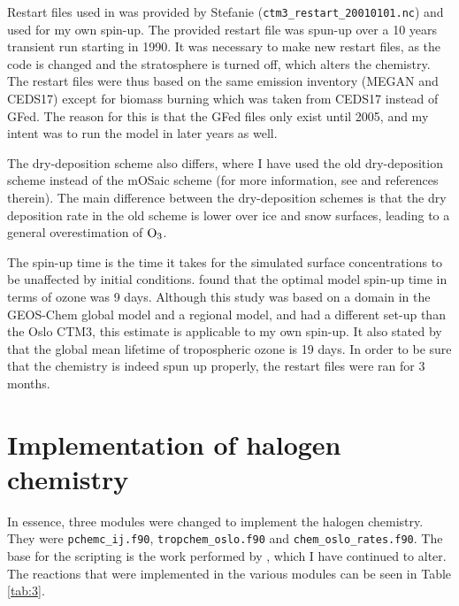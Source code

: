 \medskip

Restart files used in \cite{Falk_2019} was provided by Stefanie (\texttt{ctm3\_restart\_20010101.nc}) and used for my own spin-up. The provided restart file was spun-up over a 10 years transient run starting in 1990. It was necessary to make new restart files, as the code is changed and the stratosphere is turned off, which alters the chemistry. The restart files were thus based on the same emission inventory (MEGAN and CEDS17) except for biomass burning which was taken from CEDS17 instead of GFed. The reason for this is that the GFed files only exist until 2005, and my intent was to run the model in later years as well. 

\medskip


The dry-deposition scheme also differs, where I have used the old dry-deposition scheme instead of the mOSaic scheme (for more information, see \cite{Falk_2019} and references therein). The main difference between the dry-deposition schemes is that the dry deposition rate in the old scheme is lower over ice and snow surfaces, leading to a general overestimation of $\mathrm{O_3}$.


\medskip

The spin-up time is the time it takes for the simulated surface concentrations to be unaffected by initial conditions. \cite{Curci_AirPollution} found that the optimal model spin-up time in terms of ozone was 9 days. Although this study was based on a domain in the GEOS-Chem global model and a regional model, and had a different set-up than the Oslo CTM3, this estimate is applicable to my own spin-up. It also stated by \cite{SeinfeldSpyros} that the global mean lifetime of tropospheric ozone is 19 days. In order to be sure that the chemistry is indeed spun up properly, the restart files were ran for 3 months. 




\section{Implementation of halogen chemistry}

In essence, three modules were changed to implement the halogen chemistry. They were \texttt{pchemc\_ij.f90}, \texttt{tropchem\_oslo.f90} and \texttt{chem\_oslo\_rates.f90}. The base for the scripting is the work performed by \cite{Susanne}, which I have continued to alter.  The reactions that were implemented in the various modules can be seen in Table \ref{tab:3}.


